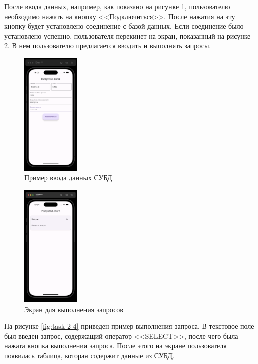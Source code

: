 \documentclass[a4paper, 14pt]{extarticle}
\begin{document}
После ввода данных, например, как показано на рисунке \ref{fig:task-2-2},
пользователю необходимо нажать на кнопку <<Подключиться>>. После нажатия на эту
кнопку будет установлено соединение с базой данных. Если соединение было
установлено успешно, пользователя перекинет на экран, показанный на рисунке
\ref{fig:task-2-3}. В нем пользователю предлагается вводить и выполнять запросы.

\begin{figure}[H]
  \centering
  \includegraphics[width=0.25\textwidth]{images/task-2/2.png}
  \caption{Пример ввода данных СУБД}
  \label{fig:task-2-2}
\end{figure}

\begin{figure}[H]
  \centering
  \includegraphics[width=0.25\textwidth]{images/task-2/3.png}
  \caption{Экран для выполнения запросов}
  \label{fig:task-2-3}
\end{figure}

На рисунке \ref{fig:task-2-4} приведен пример выполнения запроса. В текстовое
поле был введен запрос, содержащий оператор
<<\foreignlanguage{english}{SELECT}>>, после чего была нажата кнопка выполнения
запроса. После этого на экране пользователя появилась таблица, которая содержит
данные из СУБД.
\end{document}
